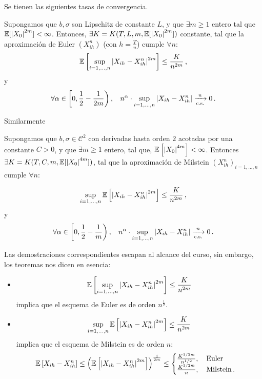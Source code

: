 Se tienen las siguientes tasas de convergencia. 
\begin{theorem}
Supongamos que $b, \sigma$ son Lipschitz de constante $L$, y que $\exists m \ge  1$ entero tal que $\mathbb{E} [\abs{X_0}^{2m}] < \infty$. Entonces, $\exists K = K(T,L,m,\mathbb{E}[\abs{X_0}^{2m}])$ constante, tal que la aproximación de Euler $(X_{ih}^{n})$ (con $h = \frac{T}{n}$) cumple $\forall n$: 
\begin{equation*}
\label{eq:sde_4}
    \mathbb{E} \left[ \sup_{i = 1,\ldots, n} \abs{X_{ih} - X_{ih}^n}^{2m} \right] \le \frac{K}{n^{2m}}\,,
\end{equation*}
y
$$ \forall \alpha \in \left\lbrack 0, \frac{1}{2} - \frac{1}{2m} \right ), \hspace{.25cm}\, n^{\alpha} \cdot \sup_{i= 1 ,\ldots, n} \abs{X_{ih} - X_{ih}^{n}} \xrightarrow[\text{c.s.}]{n} 0 \,.$$
\end{theorem}

Similarmente
\begin{theorem}
Supongamos que $b, \sigma \in \mathcal{C}^2$ con derivadas hasta orden $2$ acotadas por una constante $C >0$, y que $\exists m \ge 1$ entero, tal que, $\mathbb{E} \left[\abs{X_0}^{4m} \right] < \infty$. Entonces $\exists K = K(T,C,m,\mathbb{E}[\abs{X_0}^{4m}])$, tal que la aproximación de Milstein $(X_{ih}^{n})_{i = 1, \ldots,n}$ cumple $\forall n$: 

\begin{equation*}
\label{eq:sde_5}
    \sup_{i = 1,\ldots,n} \mathbb{E} \left[ \abs{X_{ih} - X_{ih}^{n}}^{2m}
\right] \le \frac{K}{n^{2m}}\,,
\end{equation*}
y
$$ \forall \alpha \in \left \lbrack 0, \frac{1}{2} - \frac{1}{m} \right), \hspace{.25cm}\,  n^{\alpha} \cdot \sup_{i= 1 ,\ldots, n} \abs{X_{ih} - X_{ih}^{n}} \xrightarrow[\text{c.s.}]{n} 0 \,.$$
\end{theorem}

Las demostraciones correspondientes escapan al alcance del curso, sin embargo, los teoremas nos dicen en esencia: 
\begin{itemize}
\item $$\mathbb{E} \left[ \sup_{i = 1,\ldots, n} \abs{X_{ih} - X_{ih}^n}^{2m} \right] \le \frac{K}{n^{2m}}$$ implica que el esquema de Euler es de orden $n^{\frac{1}{2}}$. 
\item $$ \sup_{i = 1,\ldots,n} \mathbb{E} \left[ \abs{X_{ih} - X_{ih}^{n}}^{2m}\right] \le \frac{K}{n^{2m}}$$ implica que el esquema de Milstein es de orden $n$: 
\begin{equation*}
    \mathbb{E} \left[ X_{ih} - X_{ih}^{n} \right] \le  \left( \mathbb{E} \left[ \abs{X_{ih} - X_{ih}^{n}}^{2m} \right] \right)^{\frac{1}{2m}} \le  
    \begin{cases}
        \frac{K^{1/2m}}{n^{1/2}}, ~ ~ ~ \text{Euler} \\
        \frac{K^{1/2m}}{n}, ~ ~ ~ \text{Milstein} \,.
    \end{cases}
\end{equation*}
\end{itemize}

